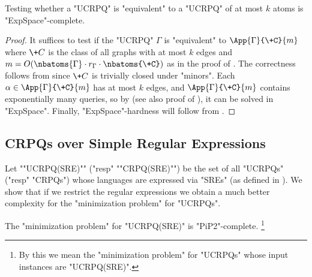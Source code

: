 \begin{corollary}
	\AP\label{coro:upperbound-ucrpqs}
	Testing whether a "UCRPQ" is "equivalent" to a "UCRPQ" of at most $k$ atoms is "ExpSpace"-complete.
\end{corollary}

\begin{proof}
	It suffices to test if the "UCRPQ" $\Gamma$ is "equivalent"
	to $\App{\Gamma}{\+C}{m}$ where $\+C$ is the class of all graphs
	with at most $k$ edges and $m=O(\nbatoms{\Gamma}\cdot r_{\Gamma} \cdot \nbatoms{\+C})$ as in the proof of . 
	The correctness follows from  since $\+C$ is
	trivially closed under "minors".
	Each $\alpha \in \App{\Gamma}{\+C}{m}$ has at most $k$ edges,
	and $\App{\Gamma}{\+C}{m}$ contains exponentially many queries,
	so by \cite[Proposition 3.11]{FM2023semantic} (see also proof of ), it can be solved
	in "ExpSpace".
	Finally, "ExpSpace"-hardness will follow from .
\end{proof}

\subsection{CRPQs over Simple Regular Expressions}

\AP Let ""UCRPQ(SRE)"" ("resp" ""CRPQ(SRE)"") be the set of all "UCRPQs" ("resp" "CRPQs") whose languages are expressed via "SREs" (as defined in ). We show that if we restrict the regular expressions we obtain a much better complexity for the "minimization problem" for "UCRPQs".

\begin{theorem}\AP\label{thm:minimization-SRE}
	The "minimization problem" for "UCRPQ(SRE)" is "PiP2"-complete.%
	\footnote{By this we mean the "minimization problem" for "UCRPQs" whose input instances are "UCRPQ(SRE)".}
\end{theorem}

